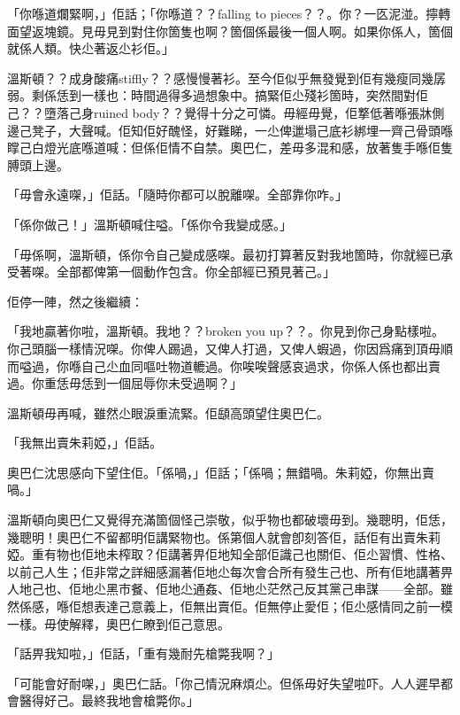 「你喺道爛緊啊，」佢話；「你喺道？？falling to pieces？？。你？一匛泥湴。擰轉面望返塊鏡。見毋見到對住你箇隻也啊？箇個係最後一個人啊。如果你係人，箇個就係人類。快尐著返尐衫佢。」

溫斯頓？？成身酸痛stiffly？？感慢慢著衫。至今佢似乎無發覺到佢有幾瘦同幾孱弱。剩係恁到一樣也：時間過得多過想象中。搞緊佢尐殘衫箇時，突然間對佢己？？墮落己身ruined body？？覺得十分之可憐。毋經毋覺，佢撉低著喺張牀側邊己凳子，大聲喊。佢知佢好醜怪，好難睇，一尐俾邋塌己底衫綁埋一齊己骨頭喺𥋇己白燈光底喺道喊：但係佢情不自禁。奧巴仁，差毋多混和感，放著隻手喺佢隻膊頭上邊。

「毋會永遠㗎，」佢話。「隨時你都可以脫離㗎。全部靠你咋。」

「係你做己！」溫斯頓喊住嗌。「係你令我變成感。」

「毋係啊，溫斯頓，係你令自己變成感㗎。最初打算著反對我地箇時，你就經已承受著㗎。全部都俾第一個動作包含。你全部經已預見著己。」

佢停一陣，然之後繼續：

「我地贏著你啦，溫斯頓。我地？？broken you up？？。你見到你己身點樣啦。你己頭腦一樣情況㗎。你俾人踢過，又俾人打過，又俾人蝦過，你因爲痛到頂毋順而嗌過，你喺自己尐血同嘔吐物道轆過。你唉唉聲感哀過求，你係人係也都出賣過。你重恁毋恁到一個屈辱你未受過啊？」

溫斯頓毋再喊，雖然尐眼淚重流緊。佢𩓥高頭望住奧巴仁。

「我無出賣朱莉婭，」佢話。

奧巴仁沈思感向下望住佢。「係喎，」佢話；「係喎；無錯喎。朱莉婭，你無出賣喎。」

溫斯頓向奧巴仁又覺得充滿箇個怪己崇敬，似乎物也都破壞毋到。幾聰明，佢恁，幾聰明！奧巴仁不留都明佢講緊物也。係第個人就會卽刻答佢，話佢有出賣朱莉婭。重有物也佢地未榨取？佢講著畀佢地知全部佢識己也關佢、佢尐習慣、性格、以前己人生；佢非常之詳細感漏著佢地尐每次會合所有發生己也、所有佢地講著畀人地己也、佢地尐黑市餐、佢地尐通姦、佢地尐茫然己反其黨己串謀——全部。雖然係感，喺佢想表達己意義上，佢無出賣佢。佢無停止愛佢；佢尐感情同之前一模一樣。毋使解釋，奧巴仁瞭到佢己意思。

「話畀我知啦，」佢話，「重有幾耐先槍斃我啊？」

「可能會好耐㗎，」奧巴仁話。「你己情況麻煩尐。但係毋好失望啦吓。人人遲早都會醫得好己。最終我地會槍斃你。」
